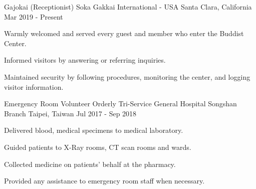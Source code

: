

\begin{cventries}

  \cventry
    {Gajokai (Receptionist)} %
    {Soka Gakkai International - USA} %
    {Santa Clara, California} %
    {Mar 2019 - Present} %
    {
	\begin{cvitems} %
      	\item Warmly welcomed and served every guest and member who enter the Buddist Center.
      	\item Informed visitors by answering or referring inquiries.
      	\item Maintained security by following procedures, monitoring the center, and logging visitor information.
	\end{cvitems}
    }
    
  \cventry
    {Emergency Room Volunteer Orderly} %
    {Tri-Service General Hospital Songshan Branch} %
    {Taipei, Taiwan} %
    {Jul 2017 - Sep 2018} %
    {
	\begin{cvitems} %
      	\item Delivered blood, medical specimens to medical laboratory.
		\item Guided patients to X-Ray rooms, CT scan rooms and wards.       
      	\item Collected medicine on patients' behalf at the pharmacy.
      	\item Provided any assistance to emergency room staff when necessary.
	\end{cvitems}
    }


\end{cventries}
